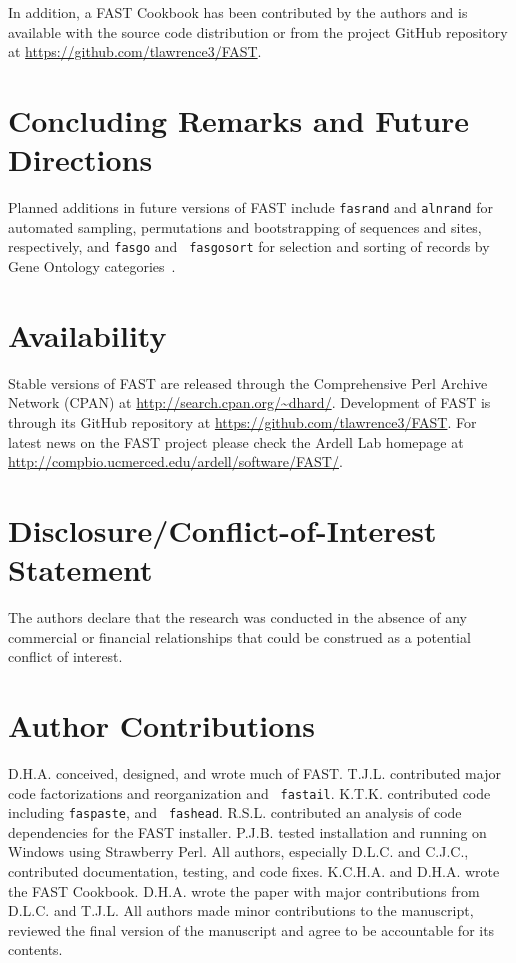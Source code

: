 \documentclass{frontiersSCNS} %
\begin{document}
In addition, a FAST Cookbook has been contributed by the authors and is
available with the source code distribution or from the project GitHub
repository at \url{https://github.com/tlawrence3/FAST}.

\section{Concluding Remarks and Future Directions}

Planned additions in future versions of FAST include {\tt fasrand} and
{\tt alnrand} for automated sampling, permutations and bootstrapping
of sequences and sites, respectively, and {\tt fasgo} and {\tt
  fasgosort} for selection and sorting of records by Gene Ontology
categories~\citep{GO_Consortium28012015}. 

\section*{Availability}

Stable versions of FAST are released through the Comprehensive Perl
Archive Network (CPAN) at
\url{http://search.cpan.org/~dhard/}. Development of FAST is through
its GitHub repository at \url{https://github.com/tlawrence3/FAST}. For
latest news on the FAST project please check the Ardell Lab homepage
at \url{http://compbio.ucmerced.edu/ardell/software/FAST/}.

\section*{Disclosure/Conflict-of-Interest Statement}

The authors declare that the research was conducted in the absence of
any commercial or financial relationships that could be construed as a
potential conflict of interest.

\section*{Author Contributions}

D.H.A. conceived, designed, and wrote much of FAST. T.J.L. contributed
major code factorizations and reorganization and {\tt
  fastail}. K.T.K. contributed code including {\tt faspaste}, and {\tt
  fashead}. R.S.L. contributed an analysis of code dependencies for
the FAST installer. P.J.B. tested installation and running on Windows
using Strawberry Perl. All authors, especially D.L.C. and C.J.C.,
contributed documentation, testing, and code fixes. K.C.H.A. and
D.H.A. wrote the FAST Cookbook. D.H.A. wrote the paper with major
contributions from D.L.C. and T.J.L. All authors made minor
contributions to the manuscript, reviewed the final version of the
manuscript and agree to be accountable for its contents.
\end{document}
